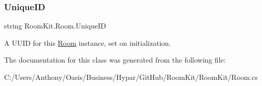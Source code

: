\mbox{\label{class_room_kit_1_1_room_a767254e52c6f4c84fdafa1cc1833cfcd}} 
\subsubsection{\texorpdfstring{Unique\+ID}{UniqueID}}
{\footnotesize\ttfamily string Room\+Kit.\+Room.\+Unique\+ID\hspace{0.3cm}{\ttfamily [get]}}



A U\+U\+ID for this \mbox{\hyperlink{class_room_kit_1_1_room}{Room}} instance, set on initialization. 



The documentation for this class was generated from the following file\+:\begin{DoxyCompactItemize}
\item 
C\+:/\+Users/\+Anthony/\+Oasis/\+Business/\+Hypar/\+Git\+Hub/\+Room\+Kit/\+Room\+Kit/Room.\+cs\end{DoxyCompactItemize}
